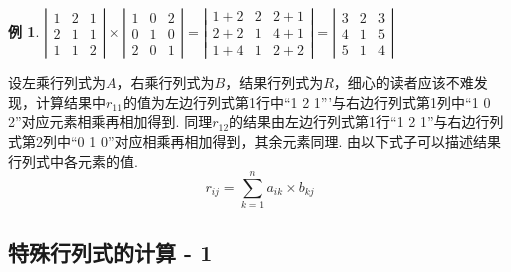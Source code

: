 \documentclass[12pt, a4paper, oneside]{ctexbook}
\newtheorem{example}[theorem]{例}
\begin{document}
\begin{example}
    $\left | \begin{matrix}
        1 & 2 & 1 \\
        2 & 1 & 1 \\
        1 & 1 & 2
    \end{matrix} \right | \times \left | \begin{matrix}
        1 & 0 & 2 \\
        0 & 1 & 0 \\
        2 & 0 & 1
    \end{matrix} \right | = \left | \begin{matrix}
        1+2 & 2 & 2+1 \\
        2+2 & 1 & 4+1 \\
        1+4 & 1 & 2+2
    \end{matrix} \right | = \left | \begin{matrix}
        3 & 2 & 3 \\
        4 & 1 & 5 \\
        5 & 1 & 4
    \end{matrix} \right |$
\end{example}

设左乘行列式为$A$，右乘行列式为$B$，结果行列式为$R$，细心的读者应该不难发现，计算结果中$r_{11}$的值为左边行列式第1行中``1 2 1'''与右边行列式第1列中``1 0 2''对应元素相乘再相加得到. 
同理$r_{12}$的结果由左边行列式第1行``1 2 1''与右边行列式第2列中``0 1 0''对应相乘再相加得到，其余元素同理. 由以下式子可以描述结果行列式中各元素的值. 
$$r_{ij} = \sum_{k=1}^na_{ik} \times b_{kj}$$

\subsection{特殊行列式的计算 - 1}
\end{document}
